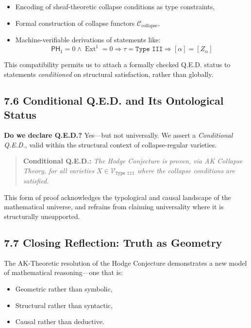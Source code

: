 \documentclass[11pt]{article}
\DeclareMathOperator{\Ext}{Ext}
\begin{document}
\begin{itemize}
  \item Encoding of sheaf-theoretic collapse conditions as type constraints,
  \item Formal construction of collapse functors $\mathcal{C}_{\text{collapse}}$,
  \item Machine-verifiable derivations of statements like:
  \[
  \mathsf{PH}_1 = 0 \wedge \Ext^1 = 0 \Rightarrow \tau = \texttt{Type III} \Rightarrow [\alpha] = [Z_\alpha]
  \]
\end{itemize}

This compatibility permits us to attach a formally checked Q.E.D. status to statements \emph{conditioned} on structural satisfaction, rather than globally.

\subsection{7.6 Conditional Q.E.D. and Its Ontological Status}

\textbf{Do we declare Q.E.D.?}  
Yes—but not universally. We assert a \emph{Conditional Q.E.D.}, valid within the structural context of collapse-regular varieties.

\begin{quote}
\textbf{Conditional Q.E.D.:}  
\emph{The Hodge Conjecture is proven, via AK Collapse Theory, for all varieties $X \in \mathcal{V}_{\texttt{Type III}}$  
where the collapse conditions are satisfied.}
\end{quote}

This form of proof acknowledges the typological and causal landscape of the mathematical universe, and refrains from claiming universality where it is structurally unsupported.

\subsection{7.7 Closing Reflection: Truth as Geometry}

The AK-Theoretic resolution of the Hodge Conjecture demonstrates a new model of mathematical reasoning—one that is:

\begin{itemize}
  \item Geometric rather than symbolic,
  \item Structural rather than syntactic,
  \item Causal rather than deductive.
\end{itemize}
\end{document}
